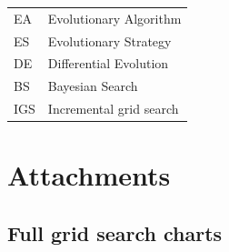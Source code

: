 \documentclass[final,12pt,a4paper]{report}
\begin{document}



\tableofcontents











\listoffigures

\listoftables

\begin{tabular}{ll}
	EA & Evolutionary Algorithm \\
	ES & Evolutionary Strategy \\
	DE & Differential Evolution \\
	BS & Bayesian Search \\
	IGS & Incremental grid search
\end{tabular}



\appendix
\chapter{Attachments}
\section{Full grid search charts}
\label{app:generationGrid}

\end{document}
